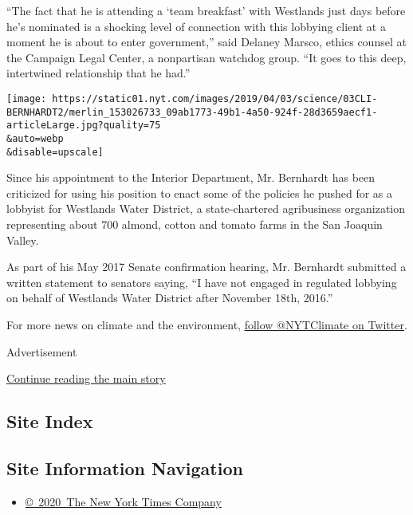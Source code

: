 ``The fact that he is attending a `team breakfast' with Westlands just
days before he's nominated is a shocking level of connection with this
lobbying client at a moment he is about to enter government,'' said
Delaney Marsco, ethics counsel at the Campaign Legal Center, a
nonpartisan watchdog group. ``It goes to this deep, intertwined
relationship that he had.''

\texttt{[image: https://static01.nyt.com/images/2019/04/03/science/03CLI-BERNHARDT2/merlin\_153026733\_09ab1773-49b1-4a50-924f-28d3659aecf1-articleLarge.jpg?quality=75\\\&auto=webp\\\&disable=upscale]}

Since his appointment to the Interior Department, Mr. Bernhardt has been
criticized for using his position to enact some of the policies he
pushed for as a lobbyist for Westlands Water District, a state-chartered
agribusiness organization representing about 700 almond, cotton and
tomato farms in the San Joaquin Valley.

As part of his May 2017 Senate confirmation hearing, Mr. Bernhardt
submitted a written statement to senators saying, ``I have not engaged
in regulated lobbying on behalf of Westlands Water District after
November 18th, 2016.''

For more news on climate and the environment,
\href{https://twitter.com/nytclimate}{follow @NYTClimate on Twitter}.

Advertisement

\protect\hyperlink{after-bottom}{Continue reading the main story}

\hypertarget{site-index}{%
\subsection{Site Index}\label{site-index}}

\hypertarget{site-information-navigation}{%
\subsection{Site Information
Navigation}\label{site-information-navigation}}

\begin{itemize}
\tightlist
\item
  \href{https://help.nytimes.com/hc/en-us/articles/115014792127-Copyright-notice}{©~2020~The
  New York Times Company}
\end{itemize}

